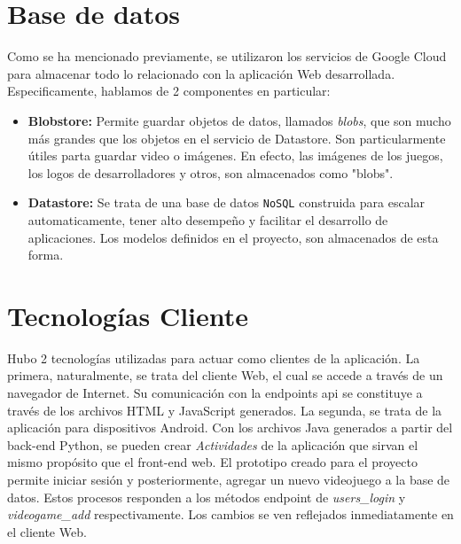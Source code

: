 \documentclass[12pt]{article}
\begin{document}
\section{Base de datos} 
Como se ha mencionado previamente, se utilizaron los servicios de Google Cloud para almacenar todo lo relacionado con la aplicación Web desarrollada. Especificamente, hablamos de 2 componentes en particular: 

	\begin{itemize}
		\item \textbf{Blobstore: }Permite guardar objetos de datos, llamados \textit{blobs}, que son mucho más grandes que los objetos en el servicio de Datastore. Son particularmente útiles parta guardar video o imágenes. En efecto, las imágenes de los juegos, los logos de desarrolladores y otros, son almacenados como "blobs". 
		
		\item \textbf{Datastore: }Se trata de una base de datos \texttt{NoSQL} construida para escalar automaticamente, tener alto desempeño y facilitar el desarrollo de aplicaciones. Los modelos definidos en el proyecto, son almacenados de esta forma. 
	\end{itemize}

\section{Tecnologías Cliente} 

Hubo 2 tecnologías utilizadas para actuar como clientes de la aplicación. La primera, naturalmente, se trata del cliente Web, el cual se accede a través de un navegador de Internet. Su comunicación con la endpoints api se constituye a través de los archivos HTML y JavaScript generados. La segunda, se trata de la aplicación para dispositivos Android. Con los archivos Java generados a partir del back-end Python, se pueden crear \textit{Actividades} de la aplicación que sirvan el mismo propósito que el front-end web. El prototipo creado para el proyecto permite iniciar sesión y posteriormente, agregar un nuevo videojuego a la base de datos. Estos procesos responden a los métodos endpoint de \textsl{users\_login} y \textsl{videogame\_add} respectivamente. Los cambios se ven reflejados inmediatamente en el cliente Web. 
\end{document}
